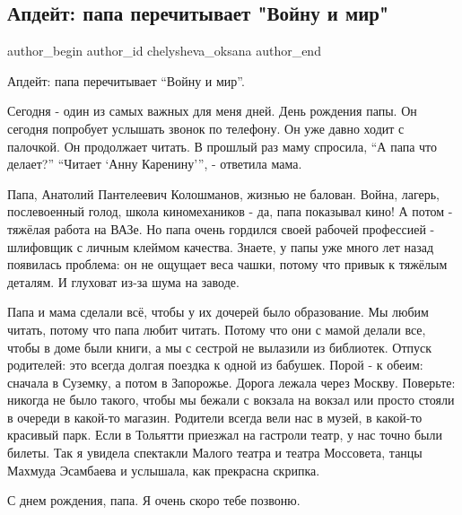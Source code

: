  
 
 
 
 
 
\subsection{Апдейт: папа перечитывает "Войну и мир"}
\label{sec:12_06_2021.fb.chelysheva_oksana.1.vojna_i_mir_papa_update}
\ifcmt
 author_begin
   author_id chelysheva_oksana
 author_end
\fi

Апдейт: папа перечитывает \enquote{Войну и мир}. 

Сегодня - один из самых важных для меня дней. День рождения папы. Он сегодня
попробует услышать звонок по телефону. Он уже давно ходит с палочкой. Он
продолжает читать. В прошлый раз маму спросила, \enquote{А папа что делает?}
\enquote{Читает \enquote{Анну Каренину}}, - ответила мама.

Папа, Анатолий Пантелеевич Колошманов, жизнью не балован. Война, лагерь,
послевоенный голод, школа киномехаников - да, папа показывал кино! А потом -
тяжёлая работа на ВАЗе. Но папа очень гордился своей рабочей профессией -
шлифовщик с личным клеймом качества. Знаете, у папы уже много лет назад
появилась проблема: он не ощущает веса чашки, потому что привык к тяжёлым
деталям. И глуховат из-за шума на заводе.

Папа и мама сделали всё, чтобы у их дочерей было образование. Мы любим читать,
потому что папа любит читать. Потому что они с мамой делали все, чтобы в доме
были книги, а мы с сестрой не вылазили из библиотек. Отпуск родителей: это
всегда долгая поездка к одной из бабушек. Порой - к обеим: сначала в Суземку, а
потом в Запорожье. Дорога лежала через Москву. Поверьте: никогда не было
такого, чтобы мы бежали с вокзала на вокзал или просто стояли в очереди в
какой-то магазин. Родители всегда вели нас в музей, в какой-то красивый парк.
Если в Тольятти приезжал на гастроли театр, у нас точно были билеты. Так я
увидела спектакли Малого театра и театра Моссовета, танцы Махмуда Эсамбаева и
услышала, как прекрасна скрипка.

С днем рождения, папа. Я очень скоро тебе позвоню.
